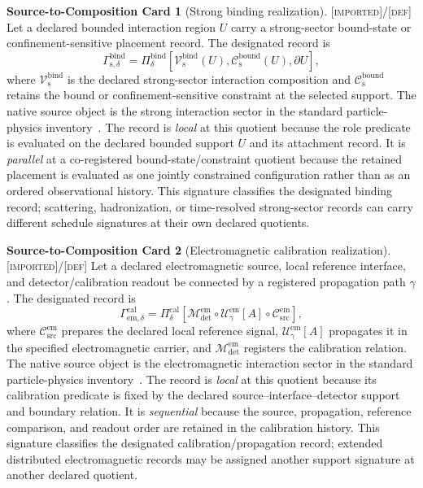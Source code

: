 \documentclass[11pt]{article}
\newcommand{\Defn}{\textsc{[def]}}
\newcommand{\Imp}{\textsc{[imported]}}
\theoremstyle{definition}
\newtheorem{compositioncard}{Source-to-Composition Card}
\begin{document}
\begin{compositioncard}[Strong binding realization]
\label{card:strong-binding-realization}
\Imp{}/\Defn{} Let a declared bounded interaction region $U$ carry a strong-sector
bound-state or confinement-sensitive placement record. The designated record is
\begin{equation}
\Gamma_{\mathrm s,\delta}^{\mathrm{bind}}=
\Pi_{\delta}^{\mathrm{bind}}\!\left[
\mathcal V_{\mathrm s}^{\mathrm{bind}}(U),
\mathcal C_{\mathrm s}^{\mathrm{bound}}(U),
\partial U
\right],
\label{eq:strong-binding-record}
\end{equation}
where $\mathcal V_{\mathrm s}^{\mathrm{bind}}$ is the declared strong-sector
interaction composition and $\mathcal C_{\mathrm s}^{\mathrm{bound}}$ retains the
bound or confinement-sensitive constraint at the selected support. The native
source object is the strong interaction sector in the standard particle-physics
inventory~\cite{S_PDG2024}. The record is \emph{local} at this quotient because the
role predicate is evaluated on the declared bounded support $U$ and its attachment
record. It is \emph{parallel} at a co-registered bound-state/constraint quotient
because the retained placement is evaluated as one jointly constrained
configuration rather than as an ordered observational history. This signature
classifies the designated binding record; scattering, hadronization, or time-resolved
strong-sector records can carry different schedule signatures at their own declared
quotients.
\end{compositioncard}

\begin{compositioncard}[Electromagnetic calibration realization]
\label{card:electromagnetic-calibration-realization}
\Imp{}/\Defn{} Let a declared electromagnetic source, local reference interface,
and detector/calibration readout be connected by a registered propagation path
$\gamma$. The designated record is
\begin{equation}
\Gamma_{\mathrm{em},\delta}^{\mathrm{cal}}=
\Pi_{\delta}^{\mathrm{cal}}\!\left[
\mathcal M_{\mathrm{det}}^{\mathrm{em}}\circ
\mathcal U_{\gamma}^{\mathrm{em}}[A]\circ
\mathcal C_{\mathrm{src}}^{\mathrm{em}}
\right],
\label{eq:electromagnetic-calibration-record}
\end{equation}
where $\mathcal C_{\mathrm{src}}^{\mathrm{em}}$ prepares the declared local
reference signal, $\mathcal U_{\gamma}^{\mathrm{em}}[A]$ propagates it in the
specified electromagnetic carrier, and $\mathcal M_{\mathrm{det}}^{\mathrm{em}}$
registers the calibration relation. The native source object is the electromagnetic
interaction sector in the standard particle-physics inventory~\cite{S_PDG2024}.
The record is \emph{local} at this quotient because its calibration predicate is
fixed by the declared source--interface--detector support and boundary relation. It
is \emph{sequential} because the source, propagation, reference comparison, and
readout order are retained in the calibration history. This signature classifies the
designated calibration/propagation record; extended distributed electromagnetic
records may be assigned another support signature at another declared quotient.
\end{compositioncard}
\end{document}
